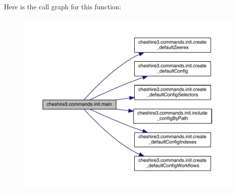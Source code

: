 Here is the call graph for this function\-:
\nopagebreak
\begin{figure}[H]
\begin{center}
\leavevmode
\includegraphics[width=350pt]{namespacecheshire3_1_1commands_1_1init_a7019f60921e43738f4f0e432fa0218d5_cgraph}
\end{center}
\end{figure}




